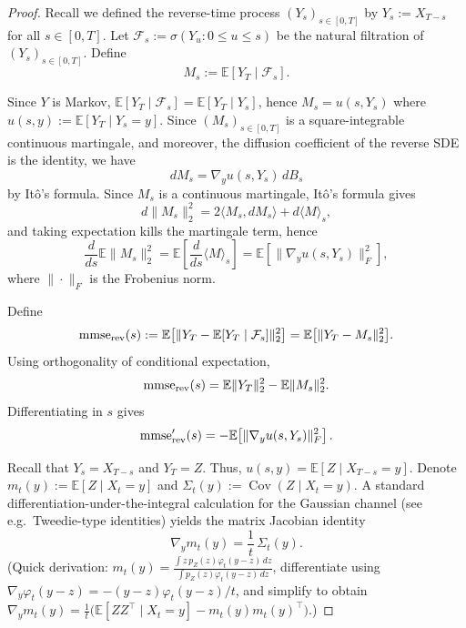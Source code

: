 \documentclass[11pt]{article}
\theoremstyle{definition}
\numberwithin{equation}{section}
\begin{document}
\begin{proof}

Recall we defined the reverse-time process $(Y_s)_{s\in[0,T]}$ by $Y_s := X_{T-s}$ for all $s\in[0,T]$. Let $\mathcal F_s:=\sigma(Y_u:0\le u\le s)$ be the natural filtration of $(Y_s)_{s\in[0,T]}$. Define 
\[
M_s:=\mathbb E[Y_T\mid \mathcal F_s].
\]

Since $Y$ is Markov, $\mathbb E[Y_T\mid \mathcal F_s]=\mathbb E[Y_T\mid Y_s]$, hence
$M_s=u(s,Y_s)$ where $u(s,y):=\mathbb E[Y_T\mid Y_s=y]$.
Since $(M_s)_{s\in[0,T]}$ is a square-integrable
continuous martingale, and moreover, the diffusion coefficient of the reverse SDE is the identity,
we have
\[
dM_s = \nabla_y u(s,Y_s)\, d B_s
\]
by It\^o's formula. 
Since $M_s$ is a continuous martingale, It\^o's formula gives
\[
d\|M_s\|_2^2 = 2\langle M_s, dM_s\rangle + d\langle M\rangle_s,
\]
and taking expectation kills the martingale term, hence
\begin{equation*}
\frac{d}{ds}\mathbb E\|M_s\|_2^2
=\mathbb E\!\left[\frac{d}{ds}\langle M\rangle_s\right]
=\mathbb E\!\left[\|\nabla_y u(s,Y_s)\|_F^2\right],
\end{equation*}
where $\|\cdot\|_F$ is the Frobenius norm. 

Define
\[
\mathrm{mmse}_{\rm rev}(s):=\mathbb E\big[\|Y_T-\mathbb E[Y_T\mid \mathcal F_s]\|_2^2\big]
=\mathbb E\big[\|Y_T-M_s\|_2^2\big].
\]
Using orthogonality of conditional expectation,
\[
\mathrm{mmse}_{\rm rev}(s)=\mathbb E\|Y_T\|_2^2-\mathbb E\|M_s\|_2^2.
\]
Differentiating in $s$ gives
\begin{equation}
\mathrm{mmse}_{\rm rev}'(s)
=-\mathbb E\!\left[\|\nabla_y u(s,Y_s)\|_F^2\right].
\label{eq:mmse-rev-deriv}
\end{equation}

Recall that $Y_s=X_{T-s}$ and $Y_T=Z$. Thus, $u(s,y)=\mathbb E[Z\mid X_{T-s}=y]$. Denote $m_t(y):=\mathbb E[Z\mid X_t=y]$ and
$\Sigma_t(y):=\operatorname{Cov}(Z\mid X_t=y)$.
A standard differentiation-under-the-integral calculation for the Gaussian channel
(see e.g.\ Tweedie-type identities) yields the matrix Jacobian identity
\begin{equation}
\nabla_y m_t(y)=\frac{1}{t}\,\Sigma_t(y).
\label{eq:jacobian-cov}
\end{equation}
(Quick derivation: $m_t(y)=\frac{\int z\,p_Z(z)\varphi_t(y-z)\,dz}{\int p_Z(z)\varphi_t(y-z)\,dz}$,
differentiate using $\nabla_y\varphi_t(y-z)=-(y-z)\varphi_t(y-z)/t$, and simplify to obtain
$\nabla_y m_t(y)=\frac{1}{t}\big(\mathbb E[ZZ^\top\!\mid X_t=y]-m_t(y)m_t(y)^\top\big)$.)


\end{proof}
\end{document}
